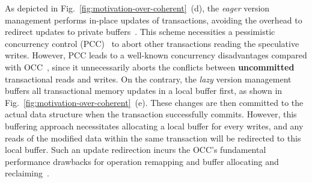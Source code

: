 As depicted in Fig.~\ref{fig:motivation-over-coherent}~(d), the \textit{eager} version management performs in-place updates of transactions, avoiding the overhead to redirect updates to private buffers~\cite{dudetm_asplos17}. This scheme necessities a pessimistic concurrency control (PCC)~\cite{book} to abort other transactions reading the speculative writes. However, PCC leads to a well-known concurrency disadvantages compared with OCC~\cite{thousandcore_vldb14}, since it unnecessarily aborts the conflicts between \textbf{uncommitted} transactional reads and writes. 
On the contrary, the \textit{lazy} version management buffers all transactional memory updates in a local buffer first, as shown in Fig.~\ref{fig:motivation-over-coherent}~(e). These changes are then committed to the actual data structure when the transaction successfully commits. However, this buffering approach necessitates allocating a local buffer for every writes, and any reads of the modified data within the same transaction will be redirected to this local buffer. Such an update redirection incurs the OCC's fundamental performance drawbacks for operation remapping and buffer allocating and reclaiming~\cite{thousandcore_vldb14, mvcc_vldb17}. 








